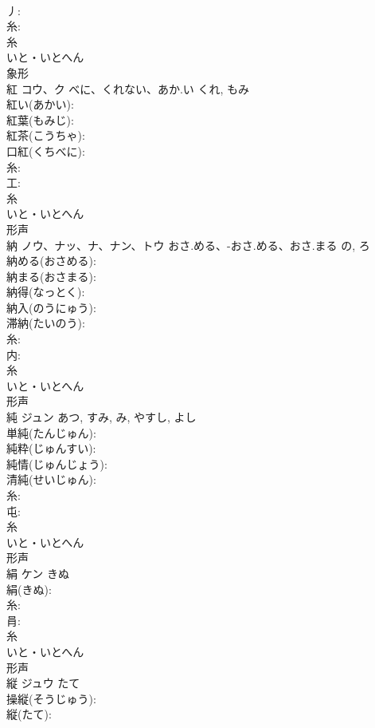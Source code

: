 \documentclass[8pt]{extreport}
\begin{document}
\begin{CJK}{UTF8}{min}
\\	丿: 
\\	糸: 
\\	糸	
\\	いと・いとへん	
\\	象形 
\\	紅	コウ、ク	べに、くれない、あか.い	くれ, もみ	
\\	紅い(あかい): 
\\	紅葉(もみじ): 
\\	紅茶(こうちゃ): 
\\	口紅(くちべに): 
\\	糸: 
\\	工: 
\\	糸	
\\	いと・いとへん	
\\	形声 
\\	納	ノウ、ナッ、ナ、ナン、トウ	おさ.める、-おさ.める、おさ.まる	の, ろ	
\\	納める(おさめる): 
\\	納まる(おさまる): 
\\	納得(なっとく): 
\\	納入(のうにゅう): 
\\	滞納(たいのう): 
\\	糸: 
\\	内: 
\\	糸	
\\	いと・いとへん	
\\	形声 
\\	純	ジュン		あつ, すみ, み, やすし, よし	
\\	単純(たんじゅん): 
\\	純粋(じゅんすい): 
\\	純情(じゅんじょう): 
\\	清純(せいじゅん): 
\\	糸: 
\\	屯: 
\\	糸	
\\	いと・いとへん	
\\	形声 
\\	絹	ケン	きぬ		
\\	絹(きぬ): 
\\	糸: 
\\	肙: 
\\	糸	
\\	いと・いとへん	
\\	形声 
\\	縦	ジュウ	たて		
\\	操縦(そうじゅう): 
\\	縦(たて): 

\end{CJK}
\end{document}
